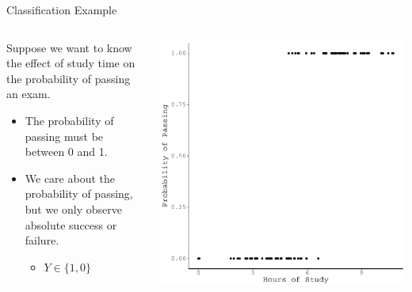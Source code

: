 \documentclass{beamer}\usepackage[]{graphicx}\usepackage[]{color}
\makeatletter
\def\maxwidth{ %
  \ifdim\Gin@nat@width>\linewidth
    \linewidth
  \else
    \Gin@nat@width
  \fi
}
\newenvironment{knitrout}{}{} %
\makeatother
\begin{document}
\watermarkoff %

\begin{frame}{Classification Example}

  \begin{columns}
    \begin{column}{0.5\textwidth}
      
      Suppose we want to know the effect of study time on the probability of
      passing an exam.  
      \vb
      \begin{itemize}
      \item The probability of passing must be between 0 and 1.
        \vc
      \item We care about the probability of passing, but we only observe 
        absolute success or failure.
        \vc
        \begin{itemize}
        \item $Y \in \{1, 0\}$
        \end{itemize}
      \end{itemize}
      
      \end{column}
    
    \begin{column}{0.5\textwidth}
      
\begin{knitrout}\footnotesize
{}\color{fgcolor}

{\centering \includegraphics[width=\maxwidth]{figure/unnamed-chunk-1-1} 

}



\end{knitrout}

\end{column}
\end{columns}

\end{frame}
\end{document}
